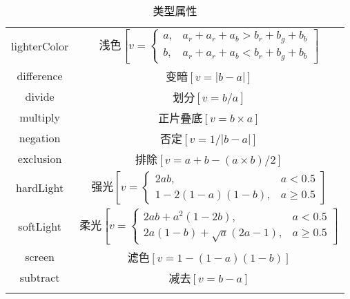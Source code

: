 \begin{longtable}{cc}
lighterColor
    &
浅色$\left[v=\begin{cases}
a, & a_r+a_r+a_b>b_r+b_g+b_b \\
b, & a_r+a_r+a_b<b_r+b_g+b_b
\end{cases}\right]$
    \\

difference
    &
变暗$\left[v=\left|b-a\right|\right]$
    \\

divide
    &
划分$\left[v=b/a\right]$
    \\

multiply
    &
正片叠底$\left[v=b\times{}a\right]$
    \\

negation
    &
否定$\left[v=1/\left|b-a\right|\right]$
    \\

exclusion
    &
排除$\left[v=a+b-(a\times{}b)/2\right]$
    \\

hardLight
    &
强光$\left[v=\begin{cases}
2ab, & a<0.5 \\
1-2(1-a)(1-b), & a\ge{}0.5
\end{cases}\right]$
    \\

softLight
    &
柔光$\left[v=\begin{cases}
2ab+a^2(1-2b), & a<0.5 \\
2a(1-b)+\sqrt{a}(2a-1), & a\ge{}0.5
\end{cases}\right]$
    \\

screen
    &
滤色$\left[v=1-(1-a)(1-b)\right]$
    \\

subtract
    &
减去$\left[v=b-a\right]$
    \\
\bottomrule            %
\caption{类型属性}\label{tb000002} %
\end{longtable}






